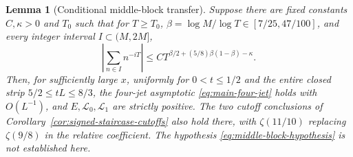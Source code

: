 \documentclass[11pt]{article}
\numberwithin{equation}{section}
\newtheorem{lemma}[theorem]{Lemma}
\theoremstyle{definition}
\theoremstyle{remark}
\newcommand{\Lag}{\mathcal L}
\begin{document}
\begin{lemma}[Conditional middle-block transfer]\label{lem:middle-block-transfer}
Suppose there are fixed constants $C,\kappa>0$ and $T_0$ such that
for $T\ge T_0$, $\beta=\log M/\log T\in[7/25,47/100]$, and every
integer interval $I\subset(M,2M]$,
\begin{equation}
 \left|\sum_{n\in I}n^{-iT}\right|
 \le C T^{\beta/2+(5/8)\beta(1-\beta)-\kappa}.
 \tag{MB}\label{eq:middle-block-hypothesis}
\end{equation}
Then, for sufficiently large $x$, uniformly for $0<t\le1/2$ and the
entire closed strip $5/2\le tL\le8/3$, the four-jet asymptotic
\eqref{eq:main-four-jet} holds with $O(L^{-1})$, and
$E,\Lag_0,\Lag_1$ are strictly positive. The two cutoff conclusions of
Corollary~\ref{cor:signed-staircase-cutoffs} also hold there, with
$\zeta(11/10)$ replacing $\zeta(9/8)$ in the relative coefficient.
The hypothesis \eqref{eq:middle-block-hypothesis} is not established here.
\end{lemma}
\end{document}
